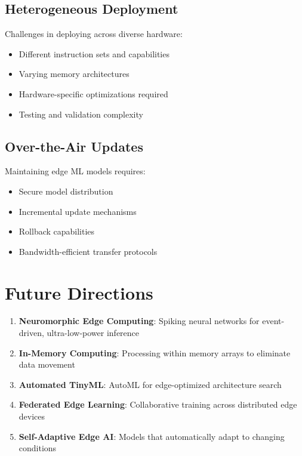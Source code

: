 \documentclass[12pt,a4paper]{article}
\begin{document}
\subsection{Heterogeneous Deployment}

Challenges in deploying across diverse hardware:
\begin{itemize}
    \item Different instruction sets and capabilities
    \item Varying memory architectures
    \item Hardware-specific optimizations required
    \item Testing and validation complexity
\end{itemize}

\subsection{Over-the-Air Updates}

Maintaining edge ML models requires:
\begin{itemize}
    \item Secure model distribution
    \item Incremental update mechanisms
    \item Rollback capabilities
    \item Bandwidth-efficient transfer protocols
\end{itemize}

\section{Future Directions}

\begin{enumerate}
    \item \textbf{Neuromorphic Edge Computing}: Spiking neural networks for event-driven, ultra-low-power inference
    \item \textbf{In-Memory Computing}: Processing within memory arrays to eliminate data movement
    \item \textbf{Automated TinyML}: AutoML for edge-optimized architecture search
    \item \textbf{Federated Edge Learning}: Collaborative training across distributed edge devices
    \item \textbf{Self-Adaptive Edge AI}: Models that automatically adapt to changing conditions
\end{enumerate}
\end{document}
